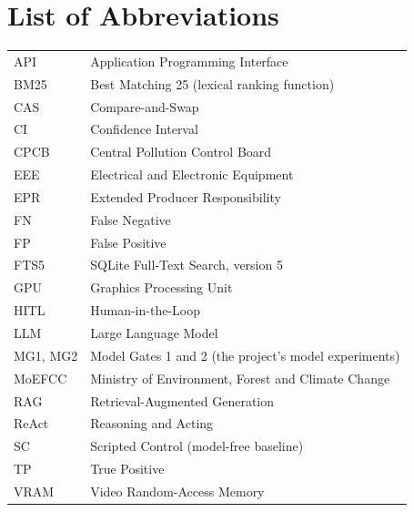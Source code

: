 \tableofcontents
\listoffigures
{}
\listoftables
{}

\chapter*{List of Abbreviations}
\thispagestyle{frontmatter}
\begin{tabular}{@{}p{2.8cm}l@{}}
API & Application Programming Interface \\
BM25 & Best Matching 25 (lexical ranking function) \\
CAS & Compare-and-Swap \\
CI & Confidence Interval \\
CPCB & Central Pollution Control Board \\
EEE & Electrical and Electronic Equipment \\
EPR & Extended Producer Responsibility \\
FN & False Negative \\
FP & False Positive \\
FTS5 & SQLite Full-Text Search, version 5 \\
GPU & Graphics Processing Unit \\
HITL & Human-in-the-Loop \\
LLM & Large Language Model \\
MG1, MG2 & Model Gates 1 and 2 (the project's model experiments) \\
MoEFCC & Ministry of Environment, Forest and Climate Change \\
RAG & Retrieval-Augmented Generation \\
ReAct & Reasoning and Acting \\
SC & Scripted Control (model-free baseline) \\
TP & True Positive \\
VRAM & Video Random-Access Memory \\
\end{tabular}
